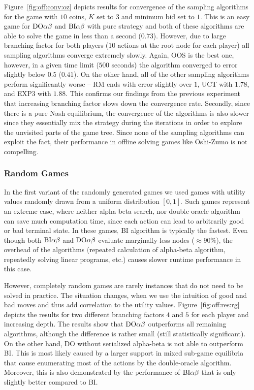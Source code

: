 Figure~\ref{fig:off:conv:oz} depicts results for convergence of the sampling algorithms for the game with $10$ coins, $K$ set to $3$ and minimum bid set to $1$. This is an easy game for $\textrm{DO}\alpha\beta$ and $\textrm{BI}\alpha\beta$ with pure strategy and both of these algorithms are able to solve the game in less than a second ($0.73$). However, due to large branching factor for both players ($10$ actions at the root node for each player) all sampling algorithms converge extremely slowly. Again, OOS is the best one, however, in a given time limit ($500$ seconds) the algorithm converged to error slightly below $0.5$ ($0.41$). On the other hand, all of the other sampling algorithms perform significantly worse -- RM ends with error slightly over $1$, UCT with $1.78$, and EXP3 with $1.88$.
This confirms our findings from the previous experiment that increasing branching factor slows down the convergence rate.
Secondly, since there is a pure Nash equilibrium, the convergence of the algorithms is also slower since they essentially mix the strategy during the iterations in order to explore the unvisited parts of the game tree. Since none of the sampling algorithms can exploit the fact, their performance in offline solving games like Oshi-Zumo is not compelling.

\subsubsection{Random Games}
In the first variant of the randomly generated games we used games with utility values randomly drawn from a uniform distribution $[0,1]$. 
Such games represent an extreme case, where neither alpha-beta search, nor double-oracle algorithm can save much computation time, since each action can lead to arbitrarily good or bad terminal state. 
In these games, \textsc{BI} algorithm is typically the fastest.
Even though both $\textrm{BI}\alpha\beta$ and $\textrm{DO}\alpha\beta$ evaluate marginally less nodes ($\approx90\%$), the overhead of the algorithms (repeated calculation of alpha-beta algorithm, repeatedly solving linear programs, etc.) causes slower runtime performance in this case.

However, completely random games are rarely instances that do not need to be solved in practice.
The situation changes, when we use the intuition of good and bad moves and thus add correlation to the utility values.
Figure~\ref{fig:off:res:rg} depicts the results for two different branching factors $4$ and $5$ for each player and increasing depth.
The results show that $\textrm{DO}\alpha\beta$ outperforms all remaining algorithms, although the difference is rather small (still statistically significant).
On the other hand, \textsc{DO} without serialized alpha-beta is not able to outperform \textsc{BI}. 
This is most likely caused by a larger support in mixed sub-game equilibria that cause enumerating most of the actions by the double-oracle algorithm. 
Moreover, this is also demonstrated by the performance of $\textrm{BI}\alpha\beta$ that is only slightly better compared to \textsc{BI}.

